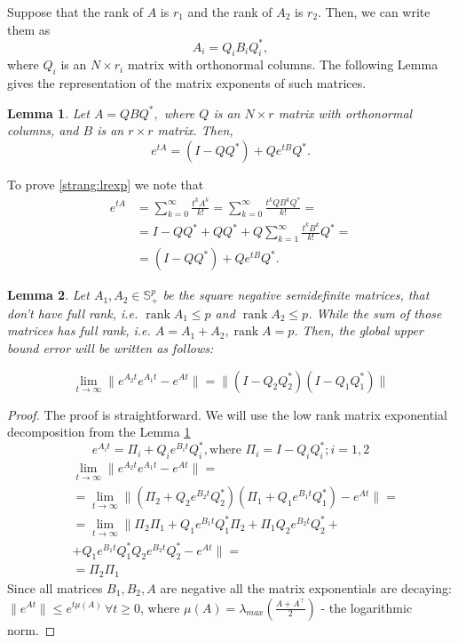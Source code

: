 \documentclass{article}
\newtheorem{lemma}{Lemma}
\begin{document}
Suppose that the rank of $A$ is $r_1$ and the rank of $A_2$ is $r_2$. Then, we can write them as
\begin{equation*}
A_i = Q_i B_i Q^*_i,
\end{equation*}
where $Q_i$ is an $N \times r_i$ matrix with orthonormal columns.  The following Lemma gives the representation of the matrix exponents of such matrices.
\begin{lemma}\label{strang:lemexp}
Let $A = Q B Q^*,$ where $Q$ is an $N \times r$ matrix with orthonormal columns, and $B$ is an $r \times r$ matrix. Then,
\begin{equation}\label{strang:lrexp}
    e^{t A}  = (I - QQ^*) + Q e^{t B} Q^*.
\end{equation}
\end{lemma}
To prove \eqref{strang:lrexp} we note that
\begin{equation*}
\begin{split}
e^{t A} &= \sum_{k=0}^{\infty} \frac{t^k A^k}{k!} = \sum_{k=0}^{\infty} \frac{t^k Q B^k Q^*}{k!} = \\ &= I - QQ^* + QQ^* + Q \sum_{k=1}^{\infty} \frac{t^k B^k}{k!} Q^* = \\ &= (I - QQ^*) + Q e^{t B} Q^*.
\end{split}
\end{equation*}

\begin{lemma}
	\label{strang:lemupper_2}
	Let $A_1, A_2 \in \mathbb{S}^p_{+}$ be the square negative semidefinite matrices, that don't have full rank, i.e. $\operatorname{rank}{A_1} \leq p$ and $\operatorname{rank}{A_2} \leq p$. While the sum of those matrices has full rank, i.e. $A = A_1 + A_2, \operatorname{rank}{A} = p$. Then, the global upper bound error will be written as follows:

	\begin{equation}\label{strang:lemupper}
		\lim_{t \to \infty}\| e^{A_2t}e^{A_1t} - e^{At}\| = \|(I - Q_2Q_2^*)(I - Q_1Q_1^*)\|
	\end{equation}
\end{lemma}
\begin{proof}
	The proof is straightforward. We will use the low rank matrix exponential decomposition from the Lemma \ref{strang:lemexp}
	$$
	e^{A_it} = \Pi_i + Q_i e^{B_it} Q_i^*, \text{where } \Pi_i = I - Q_iQ_i^*; i = 1,2
	$$
	\begin{align*}
	&\lim_{t \to \infty}\| e^{A_2t}e^{A_1t} - e^{At}\| = \\ 
	&= \lim_{t \to \infty}\| (\Pi_2 + Q_2 e^{B_2t} Q_2^*)(\Pi_1 + Q_1 e^{B_1t} Q_1^*) - e^{At}\| = \\
	&= \lim_{t \to \infty}\| \Pi_2\Pi_1 + Q_1 e^{B_1t} Q_1^*\Pi_2 + \Pi_1Q_2 e^{B_2t} Q_2^* + \\
	&+  Q_1 e^{B_1t} Q_1^* Q_2 e^{B_2t} Q_2^* - e^{At}\| =\\&= \Pi_2 \Pi_1
	\end{align*}
	Since all matrices $B_1, B_2, A$ are negative all the matrix exponentials are decaying: $\|e^{At}\|\leq e^{t\mu (A)}\, \forall t\geq 0$, where $\mu(A) = \lambda_{max} \left( \frac{A + A^\top}{2}\right)$ - the logarithmic norm.
\end{proof}
\end{document}
